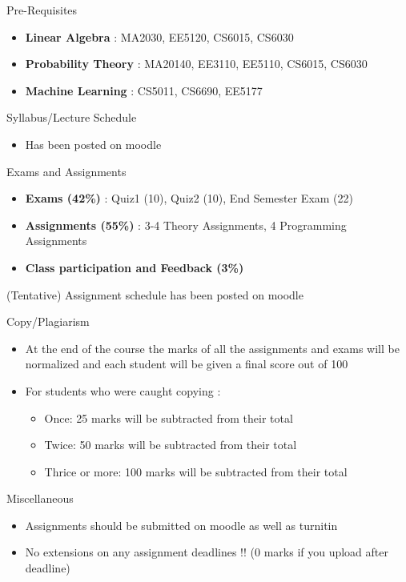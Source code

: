 \begin{frame}{Pre-Requisites}

\begin{itemize}
\item \textbf{Linear Algebra} : MA2030, EE5120, CS6015, CS6030
\item \textbf{Probability Theory} : MA20140,  EE3110, EE5110, CS6015, CS6030
\item \textbf{Machine Learning} : CS5011, CS6690, EE5177
\end{itemize}

\end{frame}

\begin{frame}{Syllabus/Lecture Schedule}

\begin{itemize}
\item Has been posted on moodle
\end{itemize}

\end{frame}

\begin{frame}{Exams and Assignments}

\begin{itemize} 
\item<1-> \textbf{Exams (42\%)} : Quiz1 (10), Quiz2 (10), End Semester Exam (22)
\item<2-> \textbf{Assignments (55\%)} : 3-4 Theory Assignments, 4 Programming Assignments
\item<3-> \textbf{Class participation and Feedback (3\%)}
\end{itemize}

(Tentative) Assignment schedule has been posted on moodle

\end{frame}


\begin{frame}{Copy/Plagiarism}
\begin{itemize} 
\item At the end of the course the marks of all the assignments and exams will be normalized and each student will be given a final score out of 100
\item<2-> For students who were caught copying :
\begin{itemize} 
\item<3-> Once: 25 marks will be subtracted from their total
\item<4-> Twice: 50 marks will be subtracted from their total
\item<5-> Thrice or more: 100 marks will be subtracted from their total
\end{itemize} 
\end{itemize} 
\end{frame}


\begin{frame}{Miscellaneous}
\begin{itemize} 
\item Assignments should be submitted on moodle as well as turnitin
\item No extensions on any assignment deadlines !! (0 marks if you upload after deadline)
\end{itemize} 
\end{frame}
